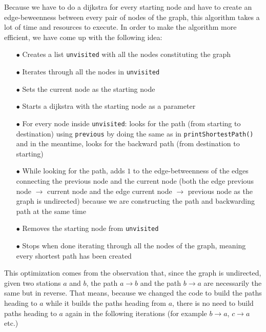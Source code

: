 \documentclass{article}
\begin{document}
\medbreak

Because we have to do a dijkstra for every starting node and have to create an edge-beweenness between every pair of nodes of the graph, this algorithm takes a lot of time and resources to execute.
In order to make the algorithm more efficient, we have come up  with the following idea:

\begin{itemize}
\item[$\bullet$] Creates a list \texttt{unvisited} with all the nodes constituting the graph
\item[$\bullet$] Iterates through all the nodes in \texttt{unvisited}
\item[$\bullet$] Sets the current node as the starting node
\item[$\bullet$] Starts a dijkstra with the starting node as a parameter
\item[$\bullet$] For every node inside \texttt{unvisited}: looks for the path (from starting to destination) using \texttt{previous} by doing the same as in \texttt{printShortestPath()} and in the meantime, looks for the backward path (from destination to starting)
\item[$\bullet$] While looking for the path, adds $1$ to the edge-betweenness of the edges connecting the previous node and the current node (both the edge previous node $\rightarrow$ current node and the edge current node $\rightarrow$ previous node as the graph is undirected) because we are constructing the path and backwarding path at the same time
\item[$\bullet$] Removes the starting node from \texttt{unvisited}
\item[$\bullet$] Stops when done iterating through all the nodes of the graph, meaning every shortest path has been created
\end{itemize}

\medbreak

This optimization comes from the observation that, since the graph is undirected, given two stations $a$ and $b$, the path $a \rightarrow b$ and the path $b \rightarrow a$ are necessarily the same but in reverse. That means, because we changed the code to build the paths heading to $a$ while it builds the paths heading from $a$, there is no need to build paths heading to $a$ again in the following iterations (for example $b \rightarrow a$, $c\rightarrow a$ etc.)

\newpage
\end{document}
